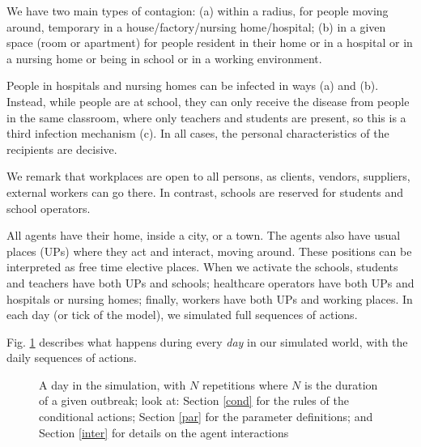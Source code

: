 \documentclass[graybox]{svmult}
\begin{document}
We have two main types of contagion: (a) within a radius, for people moving around, temporary in a house/factory/nursing home/hospital; (b) in a given space (room or apartment) for people resident in their home or in a hospital or in a nursing home or being in school or in a working environment.

People in hospitals and nursing homes can be infected in ways (a) and (b). Instead, while people are at school, they can only receive the disease from people in the same classroom, where only teachers and students are present, so this is a third infection mechanism (c). In all cases, the personal characteristics of the recipients are decisive.

We remark that workplaces are open to all persons, as clients, vendors, suppliers, external workers can go there. In contrast, schools are reserved for students and school operators.

All agents have their home, inside a city, or a town. The agents also have usual places (UPs) where they act and interact, moving around. These positions can be interpreted as free time elective places. When we activate the schools, students and teachers have both UPs and schools; healthcare operators have both UPs and hospitals or nursing homes; finally, workers have both UPs and working places. In each day (or tick of the model), we simulated full sequences of actions.

Fig. \ref{outline} describes what happens during every \emph{day} in our simulated world, with the daily sequences of actions.



\begin{figure}[t]
\center
{}
\caption{A day in the simulation, with $N$ repetitions where $N$ is the duration of a given outbreak; look at: Section \ref{cond} for the rules of the conditional actions; Section \ref{par} for the parameter definitions; and Section \ref{inter} for details on the agent interactions}
\label{outline}
\end{figure}
\end{document}
